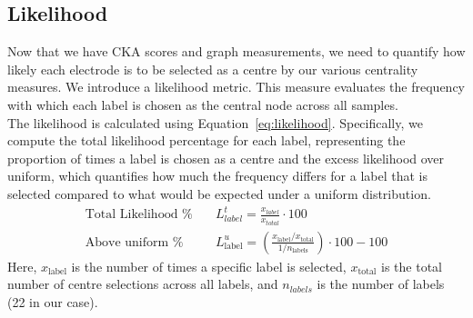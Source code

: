 \subsection{Likelihood}
Now that we have CKA scores and graph measurements, we need to quantify how likely each electrode is to be selected as a centre by our various centrality measures. We introduce a likelihood metric. This measure evaluates the frequency with which each label is chosen as the central node across all samples.
\vspace{0.5em}\\
The likelihood is calculated using Equation~\ref{eq:likelihood}. Specifically, we compute the total likelihood percentage for each label, representing the proportion of times a label is chosen as a centre and the excess likelihood over uniform, which quantifies how much the frequency differs for a label that is selected compared to what would be expected under a uniform distribution.
\begin{align}\label{eq:likelihood}
    \text{Total Likelihood \%}\quad &L^{t}_{label}= \frac{x_{label}}{x_{total}}\cdot100\\
    \text{Above uniform \%}\quad & L^{u}_{\text{label}} = \left( \frac{x_{\text{label}} / x_{\text{total}}}{1 / n_{\text{labels}}} \right) \cdot 100 - 100
\end{align}
Here, $x_{\text{label}}$ is the number of times a specific label is selected, $x_{\text{total}}$ is the total number of centre selections across all labels, and $n_{labels}$ is the number of labels (22 in our case).
